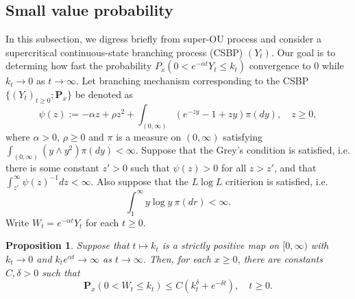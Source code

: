 \documentclass[12pt,a4paper]{amsart}
\theoremstyle{plain}
\newtheorem{prop}[thm]{Proposition}
\theoremstyle{definition}
\numberwithin{equation}{section}
\begin{document}
\subsection{Small value probability}
    In this subsection, we digress briefly from super-OU process and consider a supercritical continuous-state branching process (CSBP) $(Y_t)$. Our goal is to determing how fast the probability $P_x(0<e^{-\alpha t}Y_t \leq k_t)$ convergence to $0$ while $k_t \to 0$ as $t\to \infty$. 
    Let branching mechanism corresponding to the CSBP $\{(Y_t)_{t\geq 0}; \mathbf P_x\}$ be denoted as
\[
    \psi(z)
    := -\alpha z + \rho z^2 + \int_{(0,\infty)} (e^{-zy} - 1 + zy) \pi(dy), \quad z\geq 0,
\]
    where $\alpha > 0$, $\rho \geq 0$ and $\pi$ is a measure on $(0,\infty)$ satisfying $\int_{(0,\infty)} (y \wedge y^2) \pi(dy) < \infty$.
    Suppose that the Grey's condition is satisfied, i.e. there is some constant $z' > 0$ such that $\psi(z) > 0$ for all $z>z'$, and that $\int_{z'}^\infty \psi(z)^{-1}dz < \infty$. 
    Also suppose that the $L \log L$ critierion is satisfied, i.e. 
\[
    \int_1^\infty y \log y~\pi(dr)< \infty.
\]
    Write $W_t = e^{-\alpha t}Y_t$ for each $t\geq 0$.
\begin{prop}
\label{lem: control of XT}
    Suppose that $t\mapsto k_t$ is a strictly positive map on $[0,\infty)$ with $k_t \to 0$ and $k_t e^{\alpha t} \to \infty$ as $t\to \infty$. 
    Then, for each $x\geq 0$, there are constants $C,\delta>0$ such that
\[
    \mathbf P_x(0<W_t\leq k_t) \leq C(k_t^\delta + e^{-\delta t}), \quad t\geq 0.
\]
\end{prop}
\end{document}
